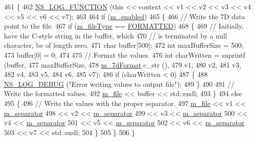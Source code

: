 \begin{DoxyCode}
461 \{
462   \hyperlink{log-macros-disabled_8h_a90b90d5bad1f39cb1b64923ea94c0761}{NS\_LOG\_FUNCTION} (\textcolor{keyword}{this} << context << v1 << v2 << v3 << v4 << v5 << v6 << v7);
463 
464   \textcolor{keywordflow}{if} (\hyperlink{classns3_1_1DataCollectionObject_a3e8b0578f03044b1db4811ecff2be7ea}{m\_enabled})
465     \{
466       \textcolor{comment}{// Write the 7D data point to the file.}
467       \textcolor{keywordflow}{if} (\hyperlink{classns3_1_1FileAggregator_aa2a8abfe3082a802dc6705e701f73e9e}{m\_fileType} == \hyperlink{classns3_1_1FileAggregator_aedb3108205a498f7ac0c564508067e2da7e34fea5d3f680d09518ee58ce4711f0}{FORMATTED})
468         \{
469           \textcolor{comment}{// Initially, have the C-style string in the buffer, which}
470           \textcolor{comment}{// is terminated by a null character, be of length zero.}
471           \textcolor{keywordtype}{char} buffer[500];
472           \textcolor{keywordtype}{int} maxBufferSize = 500;
473           buffer[0] = 0;
474 
475           \textcolor{comment}{// Format the values.}
476           \textcolor{keywordtype}{int} charWritten = snprintf (buffer,
477                                       maxBufferSize,
478                                       \hyperlink{classns3_1_1FileAggregator_a99d97fdbd128467b17b8b737c64ad50a}{m\_7dFormat}.c\_str (),
479                                       v1,
480                                       v2,
481                                       v3,
482                                       v4,
483                                       v5,
484                                       v6,
485                                       v7);
486           \textcolor{keywordflow}{if} (charWritten < 0)
487             \{
488               \hyperlink{group__logging_ga413f1886406d49f59a6a0a89b77b4d0a}{NS\_LOG\_DEBUG} (\textcolor{stringliteral}{"Error writing values to output file"});
489             \}
490 
491           \textcolor{comment}{// Write the formatted values.}
492           \hyperlink{classns3_1_1FileAggregator_a756affa0d614724be513ceedcff62ac0}{m\_file} << buffer << std::endl;
493         \}
494       \textcolor{keywordflow}{else}
495         \{
496           \textcolor{comment}{// Write the values with the proper separator.}
497           \hyperlink{classns3_1_1FileAggregator_a756affa0d614724be513ceedcff62ac0}{m\_file} << v1 << \hyperlink{classns3_1_1FileAggregator_a1f74a4c07f663d535da56dfb70414a15}{m\_separator}
498                  << v2 << \hyperlink{classns3_1_1FileAggregator_a1f74a4c07f663d535da56dfb70414a15}{m\_separator}
499                  << v3 << \hyperlink{classns3_1_1FileAggregator_a1f74a4c07f663d535da56dfb70414a15}{m\_separator}
500                  << v4 << \hyperlink{classns3_1_1FileAggregator_a1f74a4c07f663d535da56dfb70414a15}{m\_separator}
501                  << v5 << \hyperlink{classns3_1_1FileAggregator_a1f74a4c07f663d535da56dfb70414a15}{m\_separator}
502                  << v6 << \hyperlink{classns3_1_1FileAggregator_a1f74a4c07f663d535da56dfb70414a15}{m\_separator}
503                  << v7 << std::endl;
504         \}
505     \}
506 \}
\end{DoxyCode}

